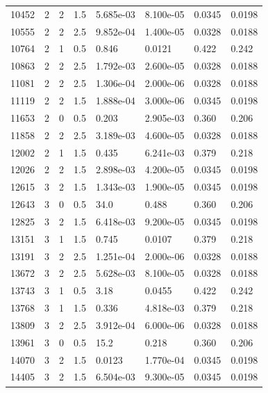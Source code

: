 \documentclass[preview]{standalone}
\begin{document}
{{{\begin{tabular}{L{1.2cm}C{1.2cm} C{0.3cm}C{0.5cm} C{1.4cm}C{1.4cm} C{1.4cm}C{1.4cm}}
  10452  &     2  & 2     & 1.5 &  5.685e-03  & 8.100e-05  & 0.0345 &  0.0198   \\ 
  10555  &     2  & 2     & 2.5 &  9.852e-04  & 1.400e-05  & 0.0328 &  0.0188   \\ 
  10764  &     2  & 1     & 0.5 &  0.846  & 0.0121  & 0.422 &  0.242   \\ 
  10863  &     2  & 2     & 2.5 &  1.792e-03  & 2.600e-05  & 0.0328 &  0.0188   \\ 
  11081  &     2  & 2     & 2.5 &  1.306e-04  & 2.000e-06  & 0.0328 &  0.0188   \\ 
  11119  &     2  & 2     & 1.5 &  1.888e-04  & 3.000e-06  & 0.0345 &  0.0198   \\ 
  11653  &     2  & 0     & 0.5 &  0.203  & 2.905e-03  & 0.360 &  0.206   \\ 
  11858  &     2  & 2     & 2.5 &  3.189e-03  & 4.600e-05  & 0.0328 &  0.0188   \\ 
  12002  &     2  & 1     & 1.5 &  0.435  & 6.241e-03  & 0.379 &  0.218   \\ 
  12026  &     2  & 2     & 1.5 &  2.898e-03  & 4.200e-05  & 0.0345 &  0.0198   \\ 
  12615  &     3  & 2     & 1.5 &  1.343e-03  & 1.900e-05  & 0.0345 &  0.0198   \\ 
  12643  &     3  & 0     & 0.5 &  34.0  & 0.488  & 0.360 &  0.206   \\ 
  12825  &     3  & 2     & 1.5 &  6.418e-03  & 9.200e-05  & 0.0345 &  0.0198   \\ 
  13151  &     3  & 1     & 1.5 &  0.745  & 0.0107  & 0.379 &  0.218   \\ 
  13191  &     3  & 2     & 2.5 &  1.251e-04  & 2.000e-06  & 0.0328 &  0.0188   \\ 
  13672  &     3  & 2     & 2.5 &  5.628e-03  & 8.100e-05  & 0.0328 &  0.0188   \\ 
  13743  &     3  & 1     & 0.5 &  3.18  & 0.0455  & 0.422 &  0.242   \\ 
  13768  &     3  & 1     & 1.5 &  0.336  & 4.818e-03  & 0.379 &  0.218   \\ 
  13809  &     3  & 2     & 2.5 &  3.912e-04  & 6.000e-06  & 0.0328 &  0.0188   \\ 
  13961  &     3  & 0     & 0.5 &  15.2  & 0.218  & 0.360 &  0.206   \\ 
  14070  &     3  & 2     & 1.5 &  0.0123  & 1.770e-04  & 0.0345 &  0.0198   \\ 
  14405  &     3  & 2     & 1.5 &  6.504e-03  & 9.300e-05  & 0.0345 &  0.0198   \\ 

\end{tabular}}}}
\end{document}
